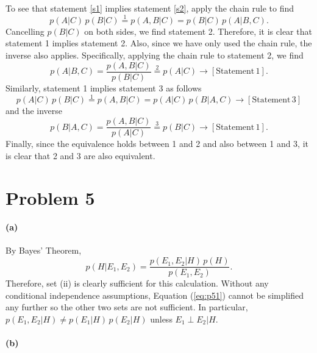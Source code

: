 \documentclass[11pt]{article}
\newcommand{\eq}[1]{Equation (\ref{eq:#1})}
\newcommand{\eqlabel}[1]{\label{eq:#1}}
\newcommand{\pr}[1]{\ensuremath{p(#1)}}
\begin{document}
\noindent To see that statement \ref{s1} implies statement \ref{s2}, apply
the chain rule to find
\begin{equation}
    \pr{A|C}\,\pr{B|C} \stackrel{1}{=} \pr{A,B|C} = \pr{B|C} \, \pr{A | B,C}.
\end{equation}
Cancelling \pr{B|C} on both sides, we find statement 2. Therefore, it is
clear that statement 1 implies statement 2. Also, since we have only used
the chain rule, the inverse also applies. Specifically, applying the chain
rule to statement 2, we find
\begin{equation}
    \pr{A|B,C} = \frac{\pr{A,B|C}}{\pr{B|C}} \stackrel{2}{=} \pr{A|C}
        \to [\mathrm{Statement}\,1].
\end{equation}
Similarly, statement 1 implies statement 3 as follows
\begin{equation}
    \pr{A|C}\,\pr{B|C} \stackrel{1}{=} \pr{A,B|C} = \pr{A|C} \, \pr{B|A,C}
        \to [\mathrm{Statement}\,3]
\end{equation}
and the inverse
\begin{equation}
    \pr{B|A,C} = \frac{\pr{A,B|C}}{\pr{A|C}} \stackrel{3}{=} \pr{B|C}
        \to [\mathrm{Statement}\,1].
\end{equation}
Finally, since the equivalence holds between 1 and 2 and also between 1 and 3,
it is clear that 2 and 3 are also equivalent.


\section{Problem 5}

\paragraph{(a)}

By Bayes' Theorem,
\begin{equation}
    \eqlabel{p51}
    \pr{H | E_1,E_2} = \frac{\pr{E_1, E_2|H} \, \pr{H}}{\pr{E_1,E_2}}.
\end{equation}
Therefore, set (ii) is clearly sufficient for this calculation. Without any
conditional independence assumptions, \eq{p51} cannot be simplified any
further so the other two sets are not sufficient. In particular,
$\pr{E_1, E_2|H} \ne \pr{E_1|H}\,\pr{E_2|H}$ unless $E_1 \perp E_2 | H$.

\paragraph{(b)}
\end{document}
